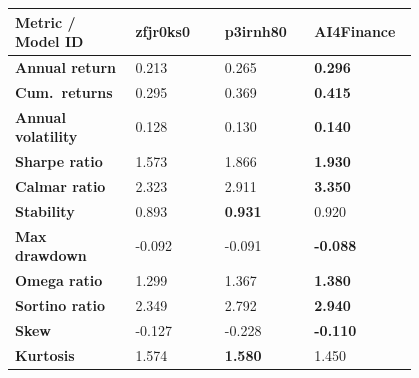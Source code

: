 \documentclass[../xlapes02]{subfiles}
\begin{document}
    \begin{table}[H]
        \centering
        {\footnotesize
            \begin{tabular}{*{4}{|m{0.20\linewidth}|}}
                \toprule
                \bfseries Metric / Model ID   & \bfseries zfjr0ks0                   & \bfseries p3irnh80                    & \bfseries AI4Finance \\[0.2cm]
                \midrule
                \bfseries Annual return       & 0.213                                & 0.265                                 & \color[HTML]{00F000} \bfseries 0.296 \\[0.2cm]
                \bfseries Cum.\ returns       & 0.295                                & 0.369                                 & \color[HTML]{00F000} \bfseries 0.415 \\[0.2cm]
                \bfseries Annual volatility   & 0.128                                & 0.130                                 & \color[HTML]{00F000} \bfseries 0.140 \\[0.2cm]
                \bfseries Sharpe ratio        & 1.573                                & 1.866                                 & \color[HTML]{00F000} \bfseries 1.930 \\[0.2cm]
                \bfseries Calmar ratio        & 2.323                                & 2.911                                 & \color[HTML]{00F000} \bfseries 3.350 \\[0.2cm]
                \bfseries Stability           & 0.893                                & \color[HTML]{00F000} \bfseries 0.931  & 0.920 \\[0.2cm]
                \bfseries Max drawdown        & -0.092                               & -0.091                                & \color[HTML]{00F000} \bfseries -0.088 \\[0.2cm]
                \bfseries Omega ratio         & 1.299                                & 1.367                                 & \color[HTML]{00F000} \bfseries 1.380 \\[0.2cm]
                \bfseries Sortino ratio       & 2.349                                & 2.792                                 & \color[HTML]{00F000} \bfseries 2.940 \\[0.2cm]
                \bfseries Skew                & -0.127                               & -0.228                                & \color[HTML]{00F000} \bfseries -0.110 \\[0.2cm]
                \bfseries Kurtosis            & 1.574                                & \color[HTML]{00F000} \bfseries 1.580  & 1.450 \\[0.2cm]

\end{tabular}}
\end{table}
\end{document}
